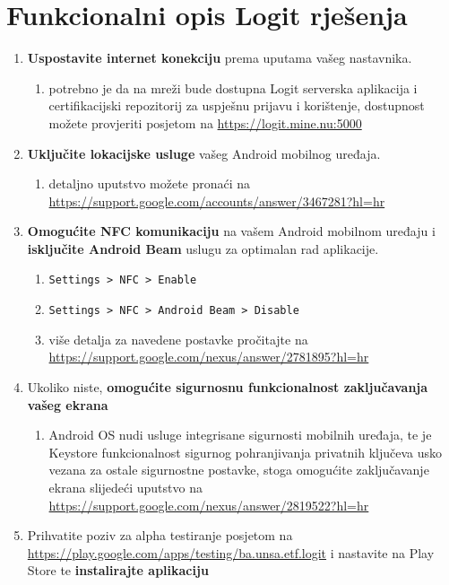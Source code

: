 \chapter{Funkcionalni opis Logit rješenja} \label{ch:man}
\begin{enumerate}
    \item \textbf{Uspostavite internet konekciju} prema uputama vašeg nastavnika.
    \begin{enumerate}
        \item potrebno je da na mreži bude dostupna Logit serverska aplikacija i certifikacijski repozitorij za uspješnu prijavu i korištenje, dostupnost možete provjeriti posjetom na \url{https://logit.mine.nu:5000}
    \end{enumerate}
    \item \textbf{Uključite lokacijske usluge} vašeg Android mobilnog uređaja.
    \begin{enumerate}
        \item detaljno uputstvo možete pronaći na \url{https://support.google.com/accounts/answer/3467281?hl=hr}
    \end{enumerate}
    \item \textbf{Omogućite NFC komunikaciju} na vašem Android mobilnom uređaju i \textbf{isključite Android Beam} uslugu za optimalan rad aplikacije.
    \begin{enumerate}
        \item \texttt{Settings > NFC > Enable}
        \item \texttt{Settings > NFC > Android Beam > Disable}
        \item više detalja za navedene postavke pročitajte na \url{https://support.google.com/nexus/answer/2781895?hl=hr}
    \end{enumerate}
    \item Ukoliko niste, \textbf{omogućite sigurnosnu funkcionalnost zaključavanja vašeg ekrana}
    \begin{enumerate}
        \item Android OS nudi usluge integrisane sigurnosti mobilnih uređaja, te je Keystore funkcionalnost sigurnog pohranjivanja privatnih ključeva usko vezana za ostale sigurnostne postavke, stoga omogućite zaključavanje ekrana slijedeći uputstvo na \url{https://support.google.com/nexus/answer/2819522?hl=hr}
    \end{enumerate}
    \item Prihvatite poziv za alpha testiranje posjetom na \url{https://play.google.com/apps/testing/ba.unsa.etf.logit} i nastavite na Play Store te \textbf{instalirajte aplikaciju}

\end{enumerate}
